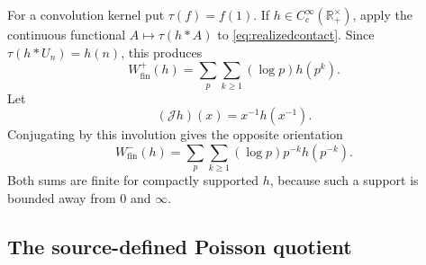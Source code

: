 \documentclass[11pt]{amsart}
\theoremstyle{definition}
\theoremstyle{remark}
\newcommand{\R}{\mathbb R}
\begin{document}
For a convolution kernel put $\tau(f)=f(1)$.  If
$h\in C_c^\infty(\R_+^\times)$, apply the continuous functional
$A\mapsto\tau(h*A)$ to \eqref{eq:realizedcontact}.  Since
$\tau(h*U_n)=h(n)$, this produces
\begin{equation}\label{eq:Wfinplus}
 W_{\mathrm{fin}}^+(h)=
 \sum_p\sum_{k\geq1}(\log p)h(p^k).
\end{equation}
Let
\begin{equation}\label{eq:Janalytic}
 (\mathscr Jh)(x)=x^{-1}h(x^{-1}).
\end{equation}
Conjugating by this involution gives the opposite orientation
\begin{equation}\label{eq:Wfinminus}
 W_{\mathrm{fin}}^-(h)=
 \sum_p\sum_{k\geq1}(\log p)p^{-k}h(p^{-k}).
\end{equation}
Both sums are finite for compactly supported $h$, because such a support is
bounded away from $0$ and $\infty$.

\subsection{The source-defined Poisson quotient}
\end{document}

